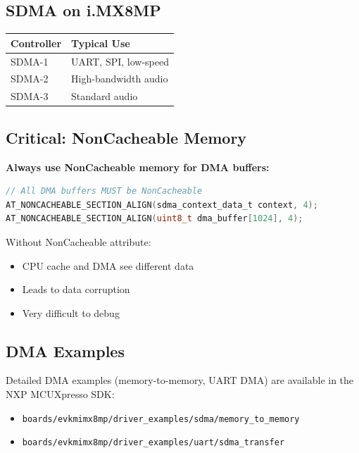 \documentclass[12pt,a4paper]{report}
\begin{document}
\subsection{SDMA on i.MX8MP}

\begin{center}
\begin{tabular}{|l|l|}
\hline
\textbf{Controller} & \textbf{Typical Use} \\
\hline
SDMA-1 & UART, SPI, low-speed \\
\hline
SDMA-2 & High-bandwidth audio \\
\hline
SDMA-3 & Standard audio \\
\hline
\end{tabular}
\end{center}

\subsection{Critical: NonCacheable Memory}

\begin{important}
\textbf{Always use NonCacheable memory for DMA buffers:}

\begin{lstlisting}[language=c]
// All DMA buffers MUST be NonCacheable
AT_NONCACHEABLE_SECTION_ALIGN(sdma_context_data_t context, 4);
AT_NONCACHEABLE_SECTION_ALIGN(uint8_t dma_buffer[1024], 4);
\end{lstlisting}

Without NonCacheable attribute:
\begin{itemize}
    \item CPU cache and DMA see different data
    \item Leads to data corruption
    \item Very difficult to debug
\end{itemize}
\end{important}

\subsection{DMA Examples}

Detailed DMA examples (memory-to-memory, UART DMA) are available in the NXP MCUXpresso SDK:

\begin{itemize}
    \item \texttt{boards/evkmimx8mp/driver\_examples/sdma/memory\_to\_memory}
    \item \texttt{boards/evkmimx8mp/driver\_examples/uart/sdma\_transfer}
\end{itemize}
\end{document}
